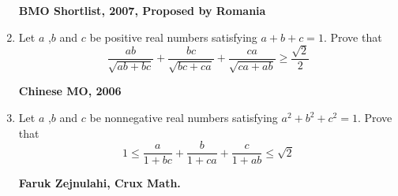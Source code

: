 \documentclass{article}
\begin{document}
\begin{enumerate}
\begin{flushright}
	\textbf{BMO Shortlist, 2007, Proposed by Romania}
\end{flushright}
\item Let $a$ ,$b$ and $c$ be positive real numbers satisfying $a+b+c=1$. Prove that$$\frac{ab}{\sqrt{ab+bc}}+\frac{bc}{\sqrt{bc+ca}}+\frac{ca}{\sqrt{ca+ab}}\geq \frac{\sqrt{2}}{2}$$
\begin{flushright}
	\textbf{Chinese MO, 2006}
\end{flushright}
\item Let $a$ ,$b$ and $c$ be nonnegative real numbers satisfying $a^2+b^2+c^2=1$. Prove that$$1\leq \frac{a}{1+bc}+\frac{b}{1+ca}+\frac{c}{1+ab}\leq \sqrt{2}$$
\begin{flushright}
	\textbf{Faruk Zejnulahi, Crux Math.}
\end{flushright}

\pagebreak


\end{enumerate}
\end{document}
